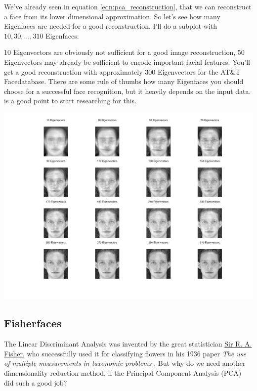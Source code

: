 We've already seen in equation \ref{eqn:pca_reconstruction}, that we can reconstruct a face from its lower dimensional approximation. So let's see how many Eigenfaces are needed for a good reconstruction. I'll do a subplot with $10,30,\ldots,310$ Eigenfaces:



10 Eigenvectors are obviously not sufficient for a good image reconstruction, 50 Eigenvectors may already be sufficient to encode important facial features. You'll get a good reconstruction with approximately 300 Eigenvectors for the AT\&T Facedatabase. There are some rule of thumbs how many Eigenfaces you should choose for a successful face recognition, but it heavily depends on the input data. \cite{zhao2003frl} is a good point to start researching for this.

\begin{center}
	\includegraphics[scale=0.6]{img/eigenfaces/pca_reconstruction}
\end{center}



\subsection{Fisherfaces}
\label{ssection:fisherfaces}
The Linear Discriminant Analysis was invented by the great statistician \href{http://en.wikipedia.org/wiki/Ronald_Fisher}{Sir R. A. Fisher}, who successfully used it for classifying flowers in his 1936 paper \textit{The use of multiple measurements in taxonomic problems} \cite{Fisher36}. But why do we need another dimensionality reduction method, if the Principal Component Analysis (PCA) did such a good job? 

